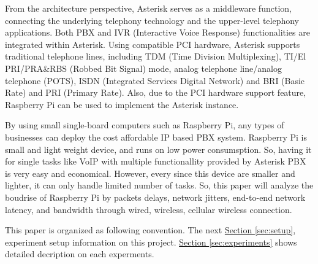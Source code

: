 From the architecture perspective, Asterisk serves as a middleware function, connecting the underlying telephony technology and the upper-level telephony applications. Both PBX and IVR (Interactive Voice Response) functionalities are integrated within Asterisk. Using compatible PCI hardware, Asterisk supports traditional telephone lines, including TDM (Time Division Multiplexing), TI/El PRI/PRA\&RBS (Robbed Bit Signal) mode, analog telephone line/analog telephone (POTS), ISDN (Integrated Services Digital Network) and BRI (Basic Rate) and PRI (Primary Rate). Also, due to the PCI hardware support feature, Raspberry Pi can be used to implement the Asterisk instance. 

By using small single-board computers such as Raspberry Pi, any types of businesses can deploy the cost affordable IP based PBX system. Raspberry Pi is small and light weight device, and runs on low power consumsption. So, having it for single tasks like VoIP with multiple functionallity provided by Asterisk PBX is very easy and economical. However, every since this device are smaller and lighter, it can only handle limited number of tasks. So, this paper will analyze the boudrise of Raspberry Pi by packets delays, network jitters, end-to-end network latency, and bandwidth through wired, wireless, cellular wireless connection. 
	
This paper is organized as following convention. The next \hyperref[sec:setup]{Section \ref{sec:setup}}, experiment setup information on this project.  \hyperref[sec:experiments]{Section \ref{sec:experiments}} shows detailed decription on each experments. 